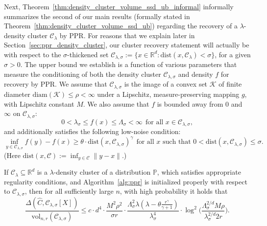 \documentclass[11pt,twoside]{article}
\newcommand{\Reals}{\mathbb{R}}
\newcommand{\1}{\mathbf{1}}
\newcommand{\Rd}{\Reals^d}
\newcommand{\mc}[1]{\mathcal{#1}}
\newcommand{\Pbb}{\mathbb{P}}
\newcommand{\wh}[1]{\widehat{#1}}
\newcommand{\dist}{\mathrm{dist}}
\newcommand{\vol}{\mathrm{vol}}
\begin{document}
Next, Theorem~\ref{thm:density_cluster_volume_ssd_ub_informal} informally summarizes the second of our main results (formally stated in Theorem~\ref{thm:density_cluster_volume_ssd_ub}) regarding the recovery of a $\lambda$-density cluster $\mc{C}_{\lambda}$ by PPR. For reasons that we explain later in Section~\ref{sec:ppr_density_cluster}, our cluster recovery statement will actually be with respect to the $\sigma$-thickened set $\mc{C}_{\lambda,\sigma} := \{x \in \Rd: \mathrm{dist}(x,\mc{C}_{\lambda}) < \sigma\}$, for a given $\sigma > 0$. The upper bound we establish is a function of various parameters that measure the conditioning of both the density cluster $\mc{C}_{\lambda,\sigma}$ and density $f$ for recovery by PPR. We assume that $\mc{C}_{\lambda,\sigma}$ is the image of a convex set $\mc{K}$ of finite diameter $\mathrm{diam}(\mc{K}) \leq \rho < \infty$ under a Lipschitz, measure-preserving mapping $g$, with Lipschitz constant $M$. We also assume that $f$ is bounded away from $0$ and $\infty$ on $\mc{C}_{\lambda,\sigma}$:
\begin{equation*}
0 < \lambda_{\sigma} \leq f(x) \leq \Lambda_{\sigma} < \infty~~\text{for all $x \in \mc{C}_{\lambda,\sigma}$},
\end{equation*}
and additionally satisfies the following low-noise condition:
\begin{equation*}
\inf_{y \in \mc{C}_{\lambda,\sigma}} f(y) - f(x) \geq  \theta \cdot \dist(x, \mc{C}_{\lambda,\sigma})^{\gamma}~~\text{for all $x$ such that $0 < \dist(x,\mc{C}_{\lambda,\sigma}) \leq \sigma$.}
\end{equation*}
(Here $\dist(x,\mc{C}) := \inf_{y \in \mc{C}} \|y - x\|$.) 
\begin{theorem}[Informal]
	\label{thm:density_cluster_volume_ssd_ub_informal}
	If $\mc{C}_{\lambda} \subseteq \Rd$ is a $\lambda$-density cluster of a distribution $\Pbb$, which satisfies appropriate regularity conditions, and Algorithm~\ref{alg:ppr} is initialized properly with respect to $\mc{C}_{\lambda,\sigma}$, then for all sufficiently large $n$, with high probability it holds that
	\begin{equation*}
	\frac{\Delta(\wh{C},\mc{C}_{\lambda,\sigma}[X])}{\vol_{n,r}(\mc{C}_{\lambda,\sigma})} \leq c \cdot d^4 \cdot \frac{M^2\rho^2}{\sigma r} \cdot \frac{\Lambda_{\sigma}^2 \lambda (\lambda - \theta \frac{r^{\gamma}}{\gamma + 1})}{\lambda_{\sigma}^4} \cdot \log^2\biggl(\frac{\Lambda_{\sigma}^{2/d} M\rho}{\lambda_{\sigma}^{2/d}2r}\biggr).
	\end{equation*}
\end{theorem}
\end{document}
